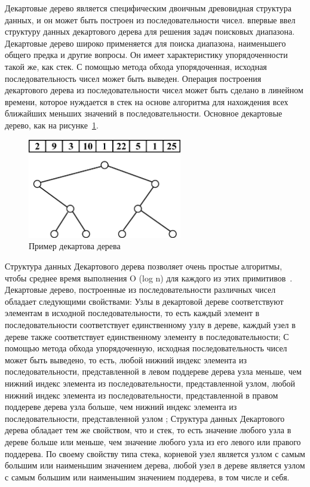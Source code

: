 \documentclass[specification,annotation]{itmo-student-thesis}
\newcommand{\revise}[1]{{\color{red!70!black} #1 }}
\begin{document}
\revise{
Декартовые дерево является специфическим двоичным древовидная структура данных, и он может быть построен из последовательности чисел. \cite{cartesian-tree} впервые ввел структуру данных декартового дерева 
для решения задач поисковых диапазона. Декартовые дерево широко применяется для поиска диапазона, наименьшего общего предка и другие вопросы. Он имеет характеристику упорядоченности такой же, как стек. С 
помощью метода обхода упорядоченная, исходная последовательность чисел может быть выведен. Операция построения декартового дерева из последовательности чисел может быть сделано в линейном времени, которое 
нуждается в стек на основе алгоритма для нахождения всех ближайших меньших значений в последовательности. Основное декартовые дерево, как на рисунке~\ref{fig:cartesian-idea}.
}

\begin{figure}[!ht]
\centering
\includegraphics[width=0.6\textwidth]{pic/cartesian-tree-idea.png}
\caption{Пример декартова дерева}\label{fig:cartesian-idea}
\end{figure}

\revise{
Структура данных Декартового дерева позволяет очень простые алгоритмы, чтобы среднее время выполнения O (log n) для каждого из этих примитивов~\cite{cartesian-tree}. Декартовые дерево, построенные из 
последовательности различных чисел обладает следующими свойствами: Узлы в декартовой дереве соответствуют элементам в исходной последовательности, то есть каждый элемент в последовательности соответствует 
единственному узлу в дереве, каждый узел в дереве также соответствует единственному элементу в последовательности; С помощью метода обхода упорядоченную, исходная последовательность чисел может быть 
выведено, то есть, любой нижний индекс элемента из последовательности, представленной в левом поддереве дерева узла меньше, чем нижний индекс элемента из последовательности, представленной узлом, любой 
нижний индекс элемента из последовательности, представленной в правом поддереве дерева узла больше, чем нижний индекс элемента из последовательности, представленной узлом ; Структура данных Декартового 
дерева обладает тем же свойством, что и стек, то есть значение любого узла в дереве больше или меньше, чем значение любого узла из его левого или правого поддерева. По своему свойству типа стека, корневой 
узел является узлом с самым большим или наименьшим значением дерева, любой узел в дереве является узлом с самым большим или наименьшим значением поддерева, в том числе и себя.
}
\end{document}
